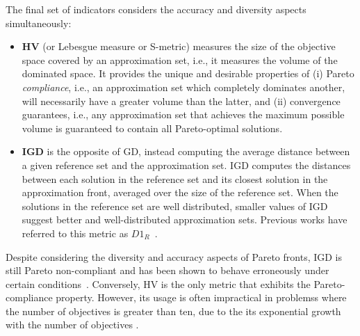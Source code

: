 	The final set of indicators considers the accuracy and diversity aspects simultaneously:
	\begin{itemize}
		\item \textbf{\ac{HV}} (or Lebesgue measure or S-metric) measures the size of the objective space covered by an approximation set, i.e., it measures the volume of the dominated space. It provides the unique and desirable properties of (i) Pareto \textit{compliance}, i.e., an approximation set which completely dominates another, will necessarily have a greater volume than the latter, and (ii) convergence guarantees, i.e., any approximation set that achieves the maximum possible volume is guaranteed to contain all Pareto-optimal solutions.
		\item \textbf{\ac{IGD}} is the opposite of \ac{GD}, instead computing the average distance between a given reference set and the approximation set. \ac{IGD} computes the distances between each solution in the reference set and its closest solution in the approximation front, averaged over the size of the reference set. When the solutions in the reference set are well distributed, smaller values of \ac{IGD} suggest better and well-distributed approximation sets. Previous works have referred to this metric as \textbf{$D1_R$}~\cite{Ishibuchi2005GDIGD}.%
	\end{itemize}
	
	Despite considering the diversity and accuracy aspects of Pareto fronts, \ac{IGD} is still Pareto non-compliant and has been shown to behave erroneously under certain conditions~\cite{Ishibuchi2005GDIGD}. Conversely, \ac{HV} is the only metric that exhibits the Pareto-compliance property. However, its usage is often impractical in problemss where the number of objectives is greater than ten, due to the its exponential growth with the number of objectives \cite{Ishibuchi2005GDIGD}.
	
	
